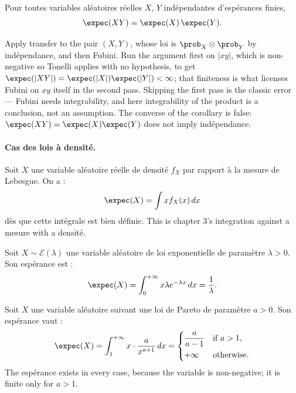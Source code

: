 \begin{corollary}
  Pour toutes variables aléatoires réelles $X$, $Y$ indépendantes d'espérances
  finies,
  \[
    \expec(XY) = \expec(X)\,\expec(Y).
  \]
\end{corollary}

\begin{remark}
  Apply transfer to the pair $(X,Y)$, whose loi is $\prob_{X} \otimes \prob_{Y}$
  by indépendance, and then Fubini. Run the argument first on $|xy|$, which is
  non-negative so Tonelli applies with no hypothesis, to get
  $\expec(|XY|) = \expec(|X|)\expec(|Y|) < \infty$; that finiteness is what
  licenses Fubini on $xy$ itself in the second pass. Skipping the first pass is
  the classic error --- Fubini needs integrability, and here integrability of the
  product is a conclusion, not an assumption. The converse of the corollary is
  false: $\expec(XY) = \expec(X)\expec(Y)$ does not imply indépendance.
\end{remark}

\paragraph{Cas des lois à densité.}
Soit $X$ une variable aléatoire réelle de densité $f_{X}$ par rapport à la mesure
de Lebesgue. On a :
\[
  \expec(X) = \int x f_{X}(x)\,dx
\]
dès que cette intégrale est bien définie. This is chapter 3's integration against
a mesure with a densité.

\begin{example}
  Soit $X \sim \mathcal{E}(\lambda)$ une variable aléatoire de loi exponentielle
  de paramètre $\lambda > 0$. Son espérance est :
  \[
    \expec(X) = \int_{0}^{+\infty} x \lambda e^{-\lambda x}\,dx = \frac{1}{\lambda}.
  \]
\end{example}

\begin{example}
  Soit $X$ une variable aléatoire suivant une loi de Pareto de paramètre $a > 0$.
  Son espérance vaut :
  \[
    \expec(X) = \int_{1}^{+\infty} x \cdot \frac{a}{x^{a+1}}\,dx
    =
    \begin{cases}
      \dfrac{a}{a-1} & \text{if } a > 1,\\[6pt]
      +\infty & \text{otherwise.}
    \end{cases}
  \]
  The espérance exists in every case, because the variable is non-negative; it
  is finite only for $a>1$.
\end{example}


